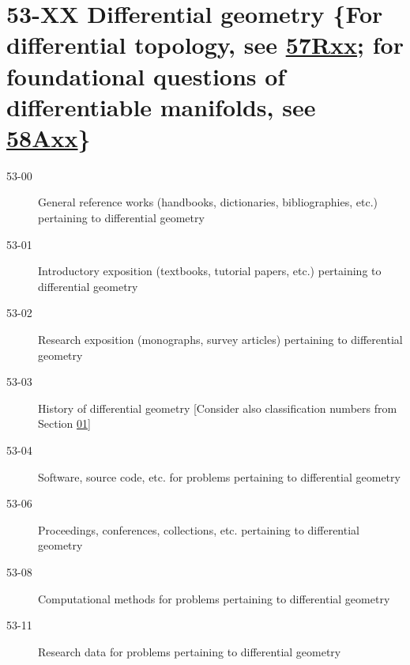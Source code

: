 \section*{53-XX Differential geometry \{For differential topology, see \hyperref[57Rxx]{57Rxx}; for foundational questions of differentiable manifolds, see \hyperref[58Axx]{58Axx}\} }\label{53-XX}
\begin{description}
\item [53-00]\label{53-00} General reference works (handbooks, dictionaries, bibliographies, etc.) pertaining to differential geometry
\item [53-01]\label{53-01} Introductory exposition (textbooks, tutorial papers, etc.) pertaining to differential geometry
\item [53-02]\label{53-02} Research exposition (monographs, survey articles) pertaining to differential geometry
\item [53-03]\label{53-03} History of differential geometry [Consider also classification numbers from Section \hyperref[01-XX]{01}]
\item [53-04]\label{53-04} Software, source code, etc. for problems pertaining to differential geometry
\item [53-06]\label{53-06} Proceedings, conferences, collections, etc. pertaining to differential geometry
\item [53-08]\label{53-08} Computational methods for problems pertaining to differential geometry
\item [53-11]\label{53-11} Research data for problems pertaining to differential geometry
\end{description}
